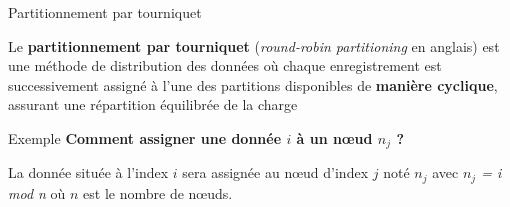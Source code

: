 \begin{frame}{Partitionnement par tourniquet}

    \begin{definitionbox}
        Le \textbf{partitionnement par tourniquet} (\textit{round-robin partitioning} en anglais) est une méthode de distribution des données où chaque enregistrement est successivement assigné à l'une des partitions disponibles de \textbf{manière cyclique}, assurant une répartition équilibrée de la charge
    \end{definitionbox}

    \pause

    \begin{examplebox}{Exemple}
        \textbf{Comment assigner une donnée $i$ à un n\oe{}ud $n_j$ ?}

        La donnée située à l'index $i$ sera assignée au n\oe{}ud d'index $j$ noté $n_j$ avec \textit{$n_j$ = i mod n} où $n$ est le nombre de n\oe{}uds.
    \end{examplebox}

\end{frame}


